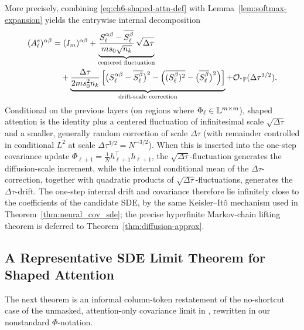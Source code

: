 More precisely, combining \eqref{eq:ch6-shaped-attn-def} with Lemma~\ref{lem:softmax-expansion} yields the entrywise internal decomposition
\begin{equation}
\label{eq:ch6-shaped-attn-exp}
\begin{aligned}
(A_\ell^s)^{\alpha\beta}
&= (I_m)^{\alpha\beta}
  + \underbrace{\frac{S_\ell^{\alpha\beta} - \overline{S_\ell^\beta}}{m s_0 \sqrt{n_k}}\,\sqrt{\Delta\tau}}_{\text{centered fluctuation}} \\
&\quad + \underbrace{\frac{\Delta\tau}{2 m s_0^2 n_k}\left[\bigl(S_\ell^{\alpha\beta} - \overline{S_\ell^\beta}\bigr)^2 - \left(\overline{(S_\ell^\beta)^2} - \bigl(\overline{S_\ell^\beta}\bigr)^2\right)\right]}_{\text{drift-scale correction}}
  + \mathcal{O}_{{}^*\mathbb{P}}(\Delta\tau^{3/2}).
\end{aligned}
\end{equation}
Conditional on the previous layers (on regions where $\Phi_\ell \in \mathbb{L}^{m \times m}$), shaped attention is the identity plus a centered fluctuation of infinitesimal scale $\sqrt{\Delta\tau}$ and a smaller, generally random correction of scale $\Delta\tau$ (with remainder controlled in conditional $L^2$ at scale $\Delta\tau^{3/2} = N^{-3/2}$). When this is inserted into the one-step covariance update $\Phi_{\ell+1} = \frac{1}{N} h_{\ell+1}^\top h_{\ell+1}$, the $\sqrt{\Delta\tau}$-fluctuation generates the diffusion-scale increment, while the internal conditional mean of the $\Delta\tau$-correction, together with quadratic products of $\sqrt{\Delta\tau}$-fluctuations, generates the $\Delta\tau$-drift. The one-step internal drift and covariance therefore lie infinitely close to the coefficients of the candidate SDE, by the same Keisler--It\^o mechanism used in Theorem~\ref{thm:neural_cov_sde};
the precise hyperfinite Markov-chain lifting theorem is deferred to Theorem~\ref{thm:diffusion-approx}.

\subsection{A Representative SDE Limit Theorem for Shaped Attention}
\label{subsec:shaped-attn-thm}

The next theorem is an informal column-token restatement of the no-shortcut case of the unmasked, attention-only covariance limit in \cite[Theorem 4.2]{noci2023shaped}, rewritten in our nonstandard $\Phi$-notation.

